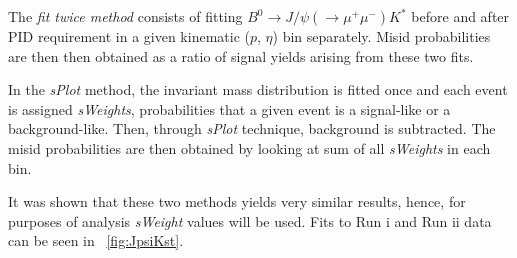 The \textit{fit twice method} consists of fitting $B^{0} \rightarrow J/\psi(\rightarrow \mu^{+} \mu^{-}) K^{*}$ before and after \gls{PID} requirement in a given kinematic ($p$, $\eta$) bin separately. Misid probabilities are then then obtained as a ratio of signal yields arising from these two fits.

In the \textit{sPlot} method, the invariant mass distribution is fitted once and each event is assigned \textit{sWeights}, probabilities that a given event is a signal-like or a background-like. Then, through \textit{sPlot} technique, background is subtracted. The misid probabilities are then obtained by looking at sum of all \textit{sWeights} in each bin.

It was shown that these two methods yields very similar results, hence,
for purposes of \Bmumumu analysis \textit{sWeight} values will be used. Fits to Run \Rn{1} and Run \Rn{2} data can be seen in ~\autoref{fig:JpsiKst}.
